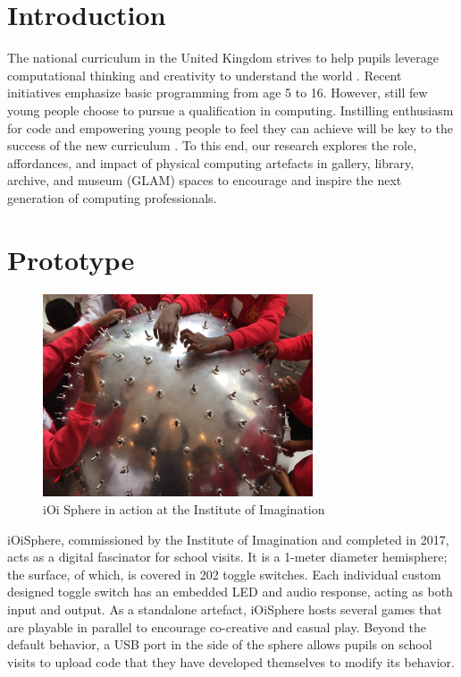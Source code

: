 \documentclass[sigconf,screen]{acmart}
\begin{document}


\maketitle

\section{Introduction}
The national curriculum in the United Kingdom strives to help pupils leverage computational thinking and creativity to understand the world \cite{Brown:2014:RRC:2642651.2602484}. Recent initiatives emphasize basic programming from age 5 to 16. However, still few young people choose to pursue a qualification in computing. Instilling enthusiasm for code and empowering young people to feel they can achieve will be key to the success of the new curriculum \cite{Howland}. To this end, our research explores the role, affordances, and impact of physical computing artefacts in gallery, library, archive, and museum (GLAM) spaces to encourage and inspire the next generation of computing professionals.

\section{Prototype}

\begin{figure}[ht]
\includegraphics[width=8cm]{ioisphere}
\centering
\setlength{\belowcaptionskip}{-12pt}
\caption{iOi Sphere in action at the Institute of Imagination}
\label{fig:sphere}
\end{figure}

iOiSphere, commissioned by the Institute of Imagination and completed in 2017, acts as a digital fascinator for school visits. It is a 1-meter diameter hemisphere; the surface, of which, is covered in 202 toggle switches. Each individual custom designed toggle switch has an embedded LED and audio response, acting as both input and output. As a standalone artefact, iOiSphere hosts several games that are playable in parallel to encourage co-creative and casual play. Beyond the default behavior, a USB port in the side of the sphere allows pupils on school visits to upload  code that they have developed themselves to modify its behavior.  
\end{document}
